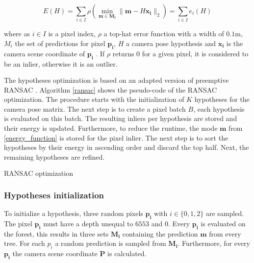 \documentclass[final]{cvpr}
\begin{document}
\begin{equation}\label{energy_function}
	E(H) = \sum_{i \in I} \rho(\min_{\boldsymbol{m} \in \boldsymbol{M_{i}}} 
	\| \boldsymbol{m} - H \boldsymbol{x_{i}} \|_{2}) = \sum_{i \in I}e_{i}(H)
\end{equation}

where as $i \in I$ is a pixel index,  $\rho$ a top-hat error function with a width of $0.1$m, $M_{i}$ 
the set of predictions for pixel $\boldsymbol{p_{i}}$, $H$ a camera pose hypothesis and $\boldsymbol{x_{i}}$ is the camera
scene coordinate of $\boldsymbol{p_{i}}$ \cite{shotton2013}. If $\rho$ returns $0$ for a given pixel, it is considered
to be an inlier, otherwise it is an outlier.

The hypotheses optimization is based on an adapted version of preemptive RANSAC \cite{shotton2013}.
Algorithm \autoref{ransac} shows the pseudo-code of the RANSAC optimization.
The procedure starts with the initialization of $K$ hypotheses for the camera pose matrix. 
The next step is to create a pixel batch $B$,
each hypothesis is evaluated on this batch. The resulting inliers per hypothesis  are stored and their energy is 
updated. Furthermore, to reduce the runtime, the mode $\boldsymbol{m}$ from \ref{energy_function} is stored for
the pixel inlier.
The next step is to sort the hypotheses by their energy in ascending order and discard the top half. Next, the remaining hypotheses are refined.

\begin{algorithm}
	\caption{RANSAC optimization}\label{ransac}
\end{algorithm}

\subsubsection{Hypotheses initialization}
To initialize a hypothesis, three random pixels $$ with $i \in \{0,1,2\}$ are sampled. The pixel $$ must have a depth unequal to $6553$ and $0$. Every $$ is evaluated on the forest, this results in three sets 
$$ containing the prediction $$ from every tree. For each $p_{i}$ a random prediction is sampled from $$. Furthermore, for every $$ the camera scene coordinate $$ is calculated.
\end{document}
